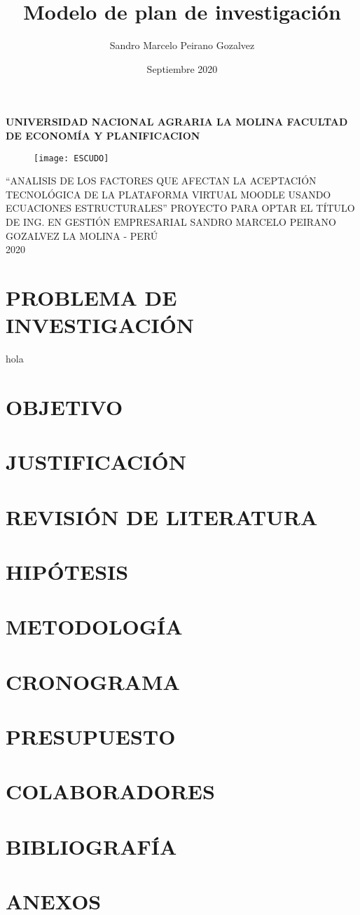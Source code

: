 \documentclass[12pt, a4paper,oneside]{memoir}
\title{Modelo de plan de investigación}
\author{Sandro Marcelo Peirano Gozalvez}
\date{Septiembre 2020}
\newcommand*{\titleASU}{\begingroup
  \begin{center}
    \bfseries
    \Large
    UNIVERSIDAD NACIONAL AGRARIA LA MOLINA
    \DoubleSpacing
    FACULTAD DE ECONOMÍA Y PLANIFICACION \\
    
    \begin{figure}[h]
      \centering
      \vspace{16pt}
      \texttt{[image: ESCUDO]}
      \vspace{16pt}
    \end{figure}
  
    \large
    ``ANALISIS DE LOS FACTORES QUE AFECTAN LA ACEPTACIÓN TECNOLÓGICA DE LA PLATAFORMA VIRTUAL MOODLE USANDO ECUACIONES ESTRUCTURALES''
    \vfill
    PROYECTO PARA OPTAR EL TÍTULO DE ING. EN GESTIÓN EMPRESARIAL
    \vfill
    SANDRO MARCELO PEIRANO GOZALVEZ
    \vfill
    LA MOLINA - PERÚ \\
    2020
  \end{center}
\endgroup}
\begin{document}
\pagestyle{empty}
\titleASU
\clearpage

\frontmatter %
\tableofcontents*


\mainmatter %
 \renewcommand*{\chapnumfont}{\normalfont\large\bfseries}
  \renewcommand*{\chaptitlefont}{\normalfont\large\bfseries}
  
\chapter{PROBLEMA DE INVESTIGACIÓN}
hola

\chapter{OBJETIVO}

\chapter{JUSTIFICACIÓN}

\chapter{REVISIÓN DE LITERATURA}

\chapter{HIPÓTESIS}

\chapter{METODOLOGÍA}

\chapter{CRONOGRAMA}

\chapter{PRESUPUESTO}

\chapter{COLABORADORES}

\chapter{BIBLIOGRAFÍA}

\chapter{ANEXOS}
\end{document}
